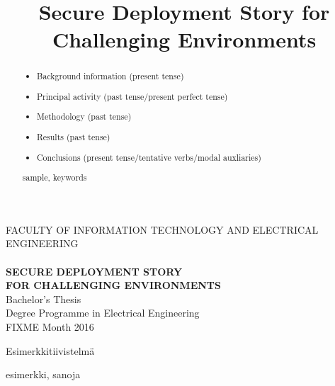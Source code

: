 \documentclass[a4paper,12pt,titlepage]{dithesis}
\title{Secure Deployment Story for Challenging Environments}
\begin{document}
\begin{titlepage}
	{{\small FACULTY OF INFORMATION TECHNOLOGY AND ELECTRICAL ENGINEERING}\\}
	\vspace{65 mm}
	{\textbf{\LARGE \getfirstname\ \getlastname }\\}
	\vspace{15 mm}
	{\textbf{\LARGE SECURE DEPLOYMENT STORY\\FOR CHALLENGING ENVIRONMENTS\\}}
	\vspace{70 mm}
	{\large {Bachelor's Thesis}\\}
	{\large {Degree Programme in Electrical Engineering}\\}
	{\large {FIXME Month 2016}\\}
\end{titlepage}


\begin{abstract}

\begin{itemize}
\item Background information (present tense)
\item Principal activity (past tense/present perfect tense)
\item Methodology (past tense)
\item Results (past tense)
\item Conclusions (present tense/tentative verbs/modal auxliaries)
\end{itemize}

\keywords sample, keywords
\end{abstract}

\begin{tiivistelma}
Esimerkkitiivistelmä

\avainsanat esimerkki, sanoja
\end{tiivistelma}
\end{document}
